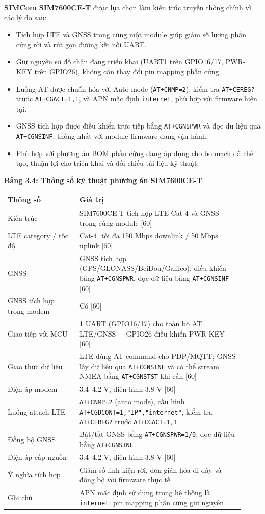 \documentclass[13pt,a4paper]{extarticle}
\newcounter{none} %
\newcommand{\thesislongtableorignewline}{}
\let\thesislongtableorignewline\\
\renewcommand{\\}{\thesislongtableorignewline\hline}%
\let\\\thesislongtableorignewline
\newcommand{\thesistabletitle}[1]{%
  \begin{center}\textbf{#1}\end{center}%
}
\providecommand{\tightlist}{%
  \setlength{\itemsep}{0pt}\setlength{\parskip}{0pt}}
\begin{document}
\textbf{SIMCom SIM7600CE-T} được lựa chọn làm kiến trúc truyền thông
chính vì các lý do sau:

\begin{itemize}
\tightlist
\item
  Tích hợp LTE và GNSS trong cùng một module giúp giảm số lượng phần
  cứng rời và rút gọn đường kết nối UART.
\item
  Giữ nguyên sơ đồ chân đang triển khai (UART1 trên GPIO16/17, PWR-KEY
  trên GPIO26), không cần thay đổi pin mapping phần cứng.
\item
  Luồng AT được chuẩn hóa với Auto mode (\texttt{AT+CNMP=2}), kiểm tra
  \texttt{AT+CEREG?} trước \texttt{AT+CGACT=1,1}, và APN mặc định
  \texttt{internet}, phù hợp với firmware hiện tại.
\item
  GNSS tích hợp được điều khiển trực tiếp bằng \texttt{AT+CGNSPWR} và
  đọc dữ liệu qua \texttt{AT+CGNSINF}, thống nhất với module firmware
  đang vận hành.
\item
  Phù hợp với phương án BOM phần cứng đang áp dụng cho bo mạch đã chế
  tạo, thuận lợi cho triển khai và đối chiếu tài liệu kỹ thuật.
\end{itemize}

\thesistabletitle{Bảng 3.4: Thông số kỹ thuật phương án SIM7600CE-T}

{\def\LTcaptype{none} %
\begin{longtable}{|p{0.28\linewidth}|p{0.64\linewidth}|}
\hline \textbf{Thông số} & \textbf{Giá trị} \\
\hline
\endhead
\hline
\endlastfoot
Kiến trúc & SIM7600CE-T tích hợp LTE Cat-4 và GNSS trong cùng module
{[}60{]} \\
LTE category / tốc độ & Cat-4, tối đa 150 Mbps downlink / 50 Mbps uplink
{[}60{]} \\
GNSS & GNSS tích hợp (GPS/GLONASS/BeiDou/Galileo), điều khiển bằng
\texttt{AT+CGNSPWR}, đọc dữ liệu bằng \texttt{AT+CGNSINF} {[}60{]} \\
GNSS tích hợp trong modem & Có {[}60{]} \\
Giao tiếp với MCU & 1 UART (GPIO16/17) cho toàn bộ AT LTE/GNSS + GPIO26
điều khiển PWR-KEY {[}60{]} \\
Giao thức dữ liệu & LTE dùng AT command cho PDP/MQTT; GNSS lấy dữ liệu
qua \texttt{AT+CGNSINF} và có thể stream NMEA bằng \texttt{AT+CGNSTST}
khi cần {[}60{]} \\
Điện áp modem & 3.4--4.2 V, điển hình 3.8 V {[}60{]} \\
Luồng attach LTE & \texttt{AT+CNMP=2} (auto mode), cấu hình
\texttt{AT+CGDCONT=1,"IP","internet"}, kiểm tra \texttt{AT+CEREG?} trước
\texttt{AT+CGACT=1,1} \\
Đồng bộ GNSS & Bật/tắt GNSS bằng \texttt{AT+CGNSPWR=1/0}, đọc dữ liệu
bằng \texttt{AT+CGNSINF} \\
Điện áp cấp nguồn & 3.4--4.2 V, điển hình 3.8 V {[}60{]} \\
Ý nghĩa tích hợp & Giảm số linh kiện rời, đơn giản hóa đi dây và đồng bộ
với firmware thực tế \\
Ghi chú & APN mặc định sử dụng trong hệ thống là \texttt{internet}; pin
mapping phần cứng giữ nguyên \\
\end{longtable}
}
\end{document}
